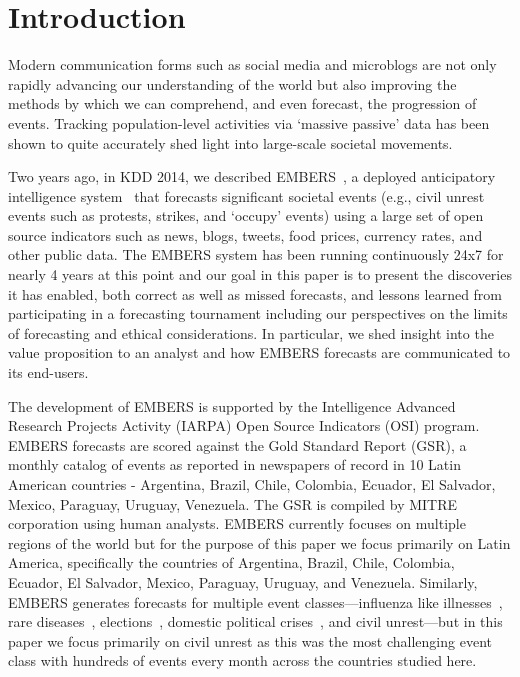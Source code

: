 \section{Introduction}
Modern communication forms such as social media and microblogs are not only rapidly
advancing our understanding of the world but also improving the methods by which we can
comprehend, and even forecast, the progression of events.
Tracking population-level activities via `massive passive' data has been shown to
quite accurately shed light into large-scale societal movements.

Two years ago, in KDD 2014, we described EMBERS~\cite{kdd:beating-the-news}, a deployed anticipatory
intelligence system~\cite{bigdata-andy-doyle-embers-paper} that forecasts significant
societal events (e.g., civil unrest
events such as protests, strikes, and `occupy' events) using a large set of open source
indicators such as news, blogs, tweets, food prices, currency rates, and other public
data. The EMBERS system has been running continuously 24x7 for nearly 4 years at this point
and our goal in this paper is to present the discoveries it has enabled,
both correct as well as missed
forecasts, and lessons learned from participating in a forecasting tournament including
our perspectives on the limits of forecasting and ethical considerations. In
particular, we shed insight into the value proposition to an analyst and how EMBERS forecasts
are communicated to its end-users.

The development of EMBERS is supported by the Intelligence Advanced Research Projects
Activity (IARPA) Open Source Indicators (OSI) program.
EMBERS forecasts are scored against the Gold Standard Report (GSR), a monthly catalog of
{\color{red}events as reported in newspapers of record in 10 Latin American
countries - Argentina, Brazil, Chile, Colombia, Ecuador, El Salvador,
Mexico, Paraguay, Uruguay, Venezuela}. The GSR is compiled by MITRE corporation
using human analysts.
EMBERS currently focuses on multiple regions of the world but for the purpose of this paper
we focus primarily on Latin America, specifically the countries of
Argentina, Brazil, Chile, Colombia, Ecuador, El Salvador, Mexico, Paraguay, Uruguay, and Venezuela.
Similarly, EMBERS generates forecasts for multiple event classes---influenza like illnesses~\cite{prithwish-ili},
rare diseases~\cite{sdm-saurav}, elections~\cite{aravindan-wei-besc}, domestic political crises~\cite{gdelt-acm-webscience}, and civil unrest---but in this paper we focus primarily on civil unrest as this was the
most challenging event class with hundreds of events every month across the countries studied here.

